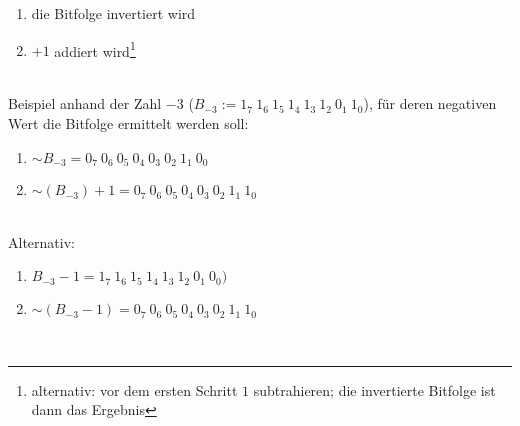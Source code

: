 \begin{enumerate}
    \item die Bitfolge invertiert wird
    \item $+1$ addiert wird\footnote{alternativ: vor dem ersten Schritt $1$ subtrahieren; die invertierte Bitfolge ist dann das Ergebnis}
\end{enumerate}\\

\noindent
Beispiel anhand der Zahl $-3$ ($B_{-3}:= 1_7\ 1_6\ 1_5\ 1_4\ 1_3\ 1_2\ 0_1\ 1_0$), für deren negativen Wert die Bitfolge ermittelt werden soll:

\begin{enumerate}
    \item $\sim B_{-3} = 0_7\ 0_6\ 0_5\ 0_4\ 0_3\ 0_2\ 1_1\ 0_0$
    \item $\sim (B_{-3}) + 1 = 0_7\ 0_6\ 0_5\ 0_4\ 0_3\ 0_2\ 1_1\ 1_0$
\end{enumerate}\\

\noindent
Alternativ:
\begin{enumerate}
    \item $B_{-3} -1 = 1_7\ 1_6\ 1_5\ 1_4\ 1_3\ 1_2\ 0_1\ 0_0)$
    \item $\sim (B_{-3} - 1) = 0_7\ 0_6\ 0_5\ 0_4\ 0_3\ 0_2\ 1_1\ 1_0$
\end{enumerate}\\


